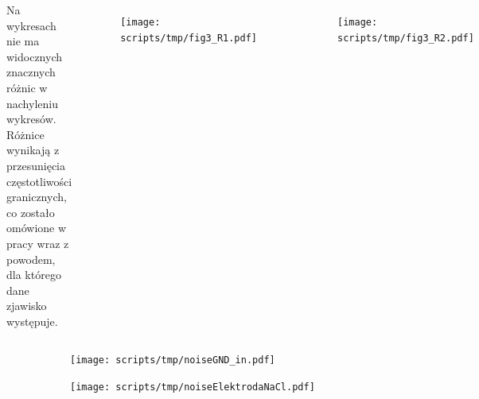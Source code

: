 \begin{frame}[t]

    \begin{block}{\tb}
    \end{block}
    \begin{columns}
        Na wykresach nie ma widocznych znacznych różnic w nachyleniu wykresów.
        Różnice wynikają z przesunięcia częstotliwości granicznych, co zostało omówione w pracy wraz z powodem, dla którego dane zjawisko występuje. 
            \begin{figure}[H]
                \centering
                \texttt{[image: scripts/tmp/fig3\_R1.pdf]}
            \end{figure}
            \begin{figure}[H]
                \centering
                \texttt{[image: scripts/tmp/fig3\_R2.pdf]}
            \end{figure}
        \end{columns}
        
        \begin{figure}[H]
            \centering
            \begin{subfigure}[b]{0.485\textwidth}
                \centering
                \texttt{[image: scripts/tmp/noiseGND\_in.pdf]}
            \end{subfigure}
            \begin{subfigure}[b]{0.485\textwidth}
                \centering
                \texttt{[image: scripts/tmp/noiseElektrodaNaCl.pdf]}
            \end{subfigure}     
        \end{figure}

\end{frame}

\begin{frame}[t]
    \begin{block}{\tb}
    \end{block}
    
\end{frame}

